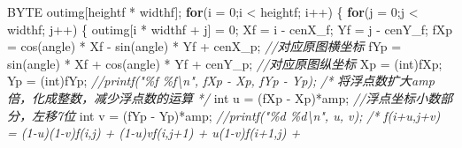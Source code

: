 \documentclass[
]{article}
\newenvironment{Shaded}{}{}
\newcommand{\CommentTok}[1]{\textcolor[rgb]{0.38,0.63,0.69}{\textit{#1}}}
\newcommand{\ControlFlowTok}[1]{\textcolor[rgb]{0.00,0.44,0.13}{\textbf{#1}}}
\newcommand{\DataTypeTok}[1]{\textcolor[rgb]{0.56,0.13,0.00}{#1}}
\newcommand{\DecValTok}[1]{\textcolor[rgb]{0.25,0.63,0.44}{#1}}
\newcommand{\NormalTok}[1]{#1}
\newcommand{\OperatorTok}[1]{\textcolor[rgb]{0.40,0.40,0.40}{#1}}
\begin{document}
\begin{Shaded}
\begin{Highlighting}[]
\NormalTok{    BYTE outimg}\OperatorTok{[}\NormalTok{heightf }\OperatorTok{*}\NormalTok{ widthf}\OperatorTok{];}
    \ControlFlowTok{for}\OperatorTok{(}\NormalTok{i }\OperatorTok{=} \DecValTok{0}\OperatorTok{;}\NormalTok{i }\OperatorTok{\textless{}}\NormalTok{ heightf}\OperatorTok{;}\NormalTok{ i}\OperatorTok{++)} \OperatorTok{\{}
        \ControlFlowTok{for}\OperatorTok{(}\NormalTok{j }\OperatorTok{=} \DecValTok{0}\OperatorTok{;}\NormalTok{j }\OperatorTok{\textless{}}\NormalTok{ widthf}\OperatorTok{;}\NormalTok{ j}\OperatorTok{++)} \OperatorTok{\{}
\NormalTok{            outimg}\OperatorTok{[}\NormalTok{i }\OperatorTok{*}\NormalTok{ widthf }\OperatorTok{+}\NormalTok{ j}\OperatorTok{]} \OperatorTok{=} \DecValTok{0}\OperatorTok{;}
\NormalTok{            Xf  }\OperatorTok{=}\NormalTok{    i }\OperatorTok{{-}}\NormalTok{ cenX\_f}\OperatorTok{;}
\NormalTok{            Yf  }\OperatorTok{=}\NormalTok{    j }\OperatorTok{{-}}\NormalTok{ cenY\_f}\OperatorTok{;}
\NormalTok{            fXp }\OperatorTok{=}\NormalTok{    cos}\OperatorTok{(}\NormalTok{angle}\OperatorTok{)} \OperatorTok{*}\NormalTok{ Xf }\OperatorTok{{-}}\NormalTok{ sin}\OperatorTok{(}\NormalTok{angle}\OperatorTok{)} \OperatorTok{*}\NormalTok{ Yf }\OperatorTok{+}\NormalTok{ cenX\_p}\OperatorTok{;}   \CommentTok{//对应原图横坐标}
\NormalTok{            fYp }\OperatorTok{=}\NormalTok{    sin}\OperatorTok{(}\NormalTok{angle}\OperatorTok{)} \OperatorTok{*}\NormalTok{ Xf }\OperatorTok{+}\NormalTok{ cos}\OperatorTok{(}\NormalTok{angle}\OperatorTok{)} \OperatorTok{*}\NormalTok{ Yf }\OperatorTok{+}\NormalTok{ cenY\_p}\OperatorTok{;}   \CommentTok{//对应原图纵坐标}
\NormalTok{            Xp  }\OperatorTok{=}    \OperatorTok{(}\DataTypeTok{int}\OperatorTok{)}\NormalTok{fXp}\OperatorTok{;}
\NormalTok{            Yp  }\OperatorTok{=}    \OperatorTok{(}\DataTypeTok{int}\OperatorTok{)}\NormalTok{fYp}\OperatorTok{;}
            \CommentTok{//printf("\%f  \%f\textbackslash{}n", fXp {-} Xp, fYp {-} Yp);}
            \CommentTok{/*}
\CommentTok{            将浮点数扩大amp倍，化成整数，减少浮点数的运算}
\CommentTok{             */}
            \DataTypeTok{int}\NormalTok{ u }\OperatorTok{=} \OperatorTok{(}\NormalTok{fXp }\OperatorTok{{-}}\NormalTok{ Xp}\OperatorTok{)*}\NormalTok{amp}\OperatorTok{;} \CommentTok{//浮点坐标小数部分，左移7位}
            \DataTypeTok{int}\NormalTok{ v }\OperatorTok{=} \OperatorTok{(}\NormalTok{fYp }\OperatorTok{{-}}\NormalTok{ Yp}\OperatorTok{)*}\NormalTok{amp}\OperatorTok{;} 
            \CommentTok{//printf("\%d \%d\textbackslash{}n", u, v);}
            \CommentTok{/*}
\CommentTok{            f(i+u,j+v) = (1{-}u)(1{-}v)f(i,j) + (1{-}u)vf(i,j+1) + u(1{-}v)f(i+1,j) + }

\end{Highlighting}
\end{Shaded}
\end{document}
